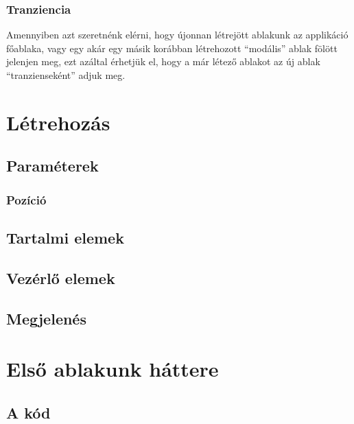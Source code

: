 \subsubsection{Tranziencia}

Amennyiben azt szeretnénk elérni, hogy újonnan létrejött ablakunk az applikáció főablaka, vagy egy akár egy másik korábban létrehozott ``modális'' ablak fölött jelenjen meg, ezt azáltal érhetjük el, hogy a már létező ablakot az új ablak ``tranzienseként'' adjuk meg.

\section{Létrehozás}

\subsection{Paraméterek}


\begin{center}
\begin{tiny}
\ttfamily
\parbox[t]{0.48 \textwidth}{

}
\parbox[t]{0.44 \textwidth}{

}
\end{tiny}
\end{center}

\subsubsection{Pozíció}

\subsection{Tartalmi elemek}

\subsection{Vezérlő elemek}

\subsection{Megjelenés}

\section{Első ablakunk háttere}

\subsection{A kód}


